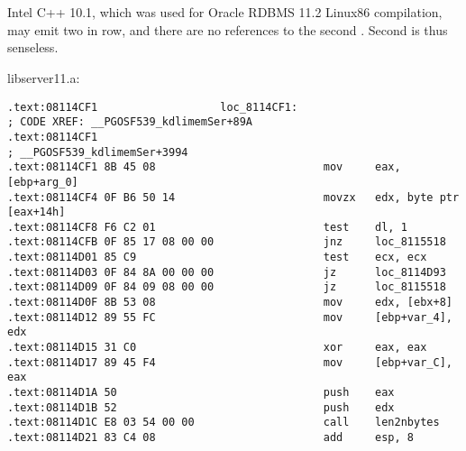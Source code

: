 \documentclass[11pt,a4paper,oneside]{book}
\begin{document}
\section{}

{Intel C++ 10.1, which was used for Oracle RDBMS 11.2 Linux86 compilation, may emit two \JZ in row,
and there are no references to the second \JZ. Second \JZ is thus senseless.}

 libserver11.a:

\begin{lstlisting}
.text:08114CF1                   loc_8114CF1:                            ; CODE XREF: __PGOSF539_kdlimemSer+89A
.text:08114CF1                                                           ; __PGOSF539_kdlimemSer+3994
.text:08114CF1 8B 45 08                          mov     eax, [ebp+arg_0]
.text:08114CF4 0F B6 50 14                       movzx   edx, byte ptr [eax+14h]
.text:08114CF8 F6 C2 01                          test    dl, 1
.text:08114CFB 0F 85 17 08 00 00                 jnz     loc_8115518
.text:08114D01 85 C9                             test    ecx, ecx
.text:08114D03 0F 84 8A 00 00 00                 jz      loc_8114D93
.text:08114D09 0F 84 09 08 00 00                 jz      loc_8115518
.text:08114D0F 8B 53 08                          mov     edx, [ebx+8]
.text:08114D12 89 55 FC                          mov     [ebp+var_4], edx
.text:08114D15 31 C0                             xor     eax, eax
.text:08114D17 89 45 F4                          mov     [ebp+var_C], eax
.text:08114D1A 50                                push    eax
.text:08114D1B 52                                push    edx
.text:08114D1C E8 03 54 00 00                    call    len2nbytes
.text:08114D21 83 C4 08                          add     esp, 8
\end{lstlisting}

\end{document}
